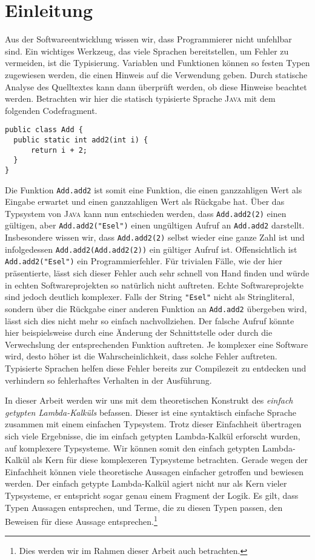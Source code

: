 \chapter{Einleitung}

Aus der Softwareentwicklung wissen wir, dass Programmierer nicht unfehlbar sind. Ein wichtiges Werkzeug, das viele Sprachen bereitstellen, um Fehler zu vermeiden, ist die Typisierung. Variablen und Funktionen können so festen Typen zugewiesen werden, die einen Hinweis auf die Verwendung geben. Durch statische Analyse des Quelltextes kann dann überprüft werden, ob diese Hinweise beachtet werden. Betrachten wir hier die statisch typisierte Sprache \textsc{Java} mit dem folgenden Codefragment.
\begin{verbatim}
public class Add {
  public static int add2(int i) {
      return i + 2;
  }
}
\end{verbatim}
Die Funktion \texttt{Add.add2} ist somit eine Funktion, die einen ganzzahligen Wert als Eingabe erwartet und einen ganzzahligen Wert als Rückgabe hat. Über das Typsystem von \textsc{Java} kann nun entschieden werden, dass \texttt{Add.add2(2)} einen gültigen, aber \texttt{Add.add2("{}Esel")} einen ungültigen Aufruf an \texttt{Add.add2} darstellt. Insbesondere wissen wir, dass \texttt{Add.add2(2)} selbst wieder eine ganze Zahl ist und infolgedessen \texttt{Add.add2(Add.add2(2))} ein gültiger Aufruf ist. Offensichtlich ist \texttt{Add.add2("{}Esel")} ein Programmierfehler. Für trivialen Fälle, wie der hier präsentierte, lässt sich dieser Fehler auch sehr schnell von Hand finden und würde in echten Softwareprojekten so natürlich nicht auftreten. Echte Softwareprojekte sind jedoch deutlich komplexer. Falls der String \texttt{"{}Esel"} nicht als Stringliteral, sondern über die Rückgabe einer anderen Funktion an \texttt{Add.add2} übergeben wird, lässt sich dies nicht mehr so einfach nachvollziehen. Der falsche Aufruf könnte hier beispielsweise durch eine Änderung der Schnittstelle oder durch die Verwechslung der entsprechenden Funktion auftreten. Je komplexer eine Software wird, desto höher ist die Wahrscheinlichkeit, dass solche Fehler auftreten. Typisierte Sprachen helfen diese Fehler bereits zur Compilezeit zu entdecken und verhindern so fehlerhaftes Verhalten in der Ausführung.

In dieser Arbeit werden wir uns mit dem theoretischen Konstrukt des \emph{einfach getypten Lambda-Kalküls} befassen. Dieser ist eine syntaktisch einfache Sprache zusammen mit einem einfachen Typsystem. Trotz dieser Einfachheit übertragen sich viele Ergebnisse, die im einfach getypten Lambda-Kalkül erforscht wurden, auf komplexere Typsysteme. Wir können somit den einfach getypten Lambda-Kalkül als Kern für diese komplexeren Typsysteme betrachten. Gerade wegen der Einfachheit können viele theoretische Aussagen einfacher getroffen und bewiesen werden. Der einfach getypte Lambda-Kalkül agiert nicht nur als Kern vieler Typsysteme, er entspricht sogar genau einem Fragment der Logik. Es gilt, dass Typen Aussagen entsprechen, und Terme, die zu diesen Typen passen, den Beweisen für diese Aussage entsprechen.\footnote{Dies werden wir im Rahmen dieser Arbeit auch betrachten.}

